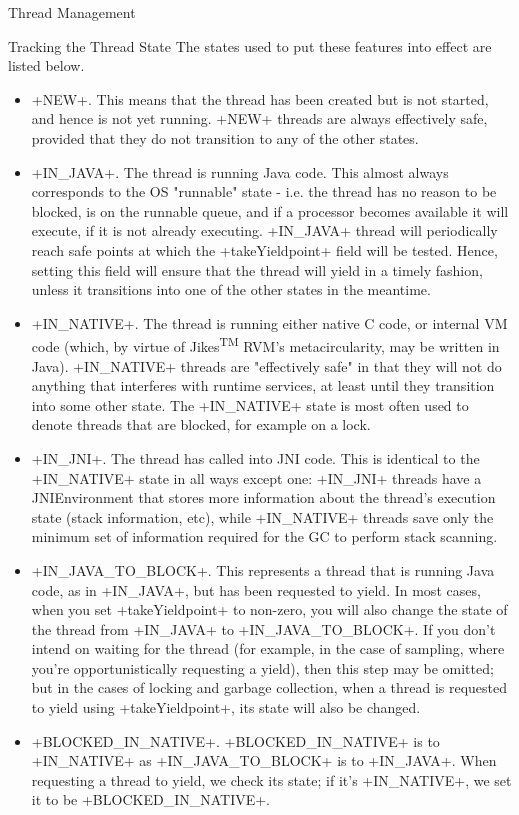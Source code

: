 \begin{section}{Thread Management}
\begin{subsection}{Tracking the Thread State}
The states used to put these features into effect are listed below.
\begin{itemize}
  \item \spverb+NEW+. This means that the thread has been created but is not started, and hence is not yet running. \spverb+NEW+ threads are always effectively safe, provided that they do not transition to any of the other states.
  \item \spverb+IN_JAVA+. The thread is running Java code. This almost always corresponds to the OS "runnable" state - i.e. the thread has no reason to be blocked, is on the runnable queue, and if a processor becomes available it will execute, if it is not already executing. \spverb+IN_JAVA+ thread will periodically reach safe points at which the \spverb+takeYieldpoint+ field will be tested. Hence, setting this field will ensure that the thread will yield in a timely fashion, unless it transitions into one of the other states in the meantime.
  \item \spverb+IN_NATIVE+. The thread is running either native C code, or internal VM code (which, by virtue of Jikes\textsuperscript{TM} RVM's metacircularity, may be written in Java). \spverb+IN_NATIVE+ threads are "effectively safe" in that they will not do anything that interferes with runtime services, at least until they transition into some other state. The \spverb+IN_NATIVE+ state is most often used to denote threads that are blocked, for example on a lock.
  \item \spverb+IN_JNI+. The thread has called into JNI code. This is identical to the \spverb+IN_NATIVE+ state in all ways except one: \spverb+IN_JNI+ threads have a JNIEnvironment that stores more information about the thread's execution state (stack information, etc), while \spverb+IN_NATIVE+ threads save only the minimum set of information required for the GC to perform stack scanning.
  \item \spverb+IN_JAVA_TO_BLOCK+. This represents a thread that is running Java code, as in \spverb+IN_JAVA+, but has been requested to yield. In most cases, when you set \spverb+takeYieldpoint+ to non-zero, you will also change the state of the thread from \spverb+IN_JAVA+ to \spverb+IN_JAVA_TO_BLOCK+. If you don't intend on waiting for the thread (for example, in the case of sampling, where you're opportunistically requesting a yield), then this step may be omitted; but in the cases of locking and garbage collection, when a thread is requested to yield using \spverb+takeYieldpoint+, its state will also be changed.
  \item \spverb+BLOCKED_IN_NATIVE+. \spverb+BLOCKED_IN_NATIVE+ is to \spverb+IN_NATIVE+ as \newline \spverb+IN_JAVA_TO_BLOCK+ is to \spverb+IN_JAVA+. When requesting a thread to yield, we check its state; if it's \spverb+IN_NATIVE+, we set it to be \spverb+BLOCKED_IN_NATIVE+.

\end{itemize}
\end{subsection}
\end{section}
